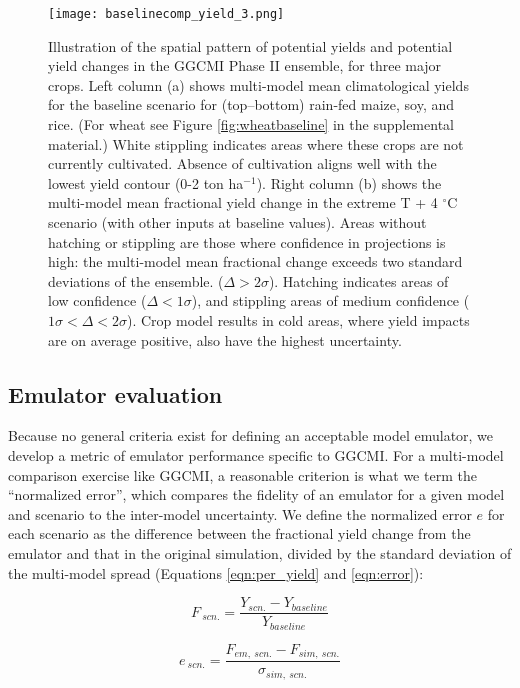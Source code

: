 \documentclass[preprint, 5p, times, twocolumn]{elsarticle}
\begin{document}
\begin{figure}[!htb]
\centering
   \texttt{[image: baselinecomp\_yield\_3.png]} 
   \caption{Illustration of the spatial pattern of potential yields and potential yield changes in the GGCMI Phase II ensemble, for three major crops. Left column (a) shows multi-model mean climatological yields for the baseline scenario for (top--bottom) rain-fed maize, soy, and rice. (For wheat see Figure \ref{fig:wheatbaseline} in the supplemental material.) White stippling indicates areas where these crops are not currently cultivated. Absence of cultivation aligns well with the lowest yield contour (0-2 ton ha$^{-1}$). Right column (b) shows the multi-model mean fractional yield change in the extreme T + 4 $^{\circ}$C scenario (with other inputs at baseline values). Areas without hatching or stippling are those where confidence in projections is high: the multi-model mean fractional change exceeds two standard deviations of the ensemble. ($\Delta > 2\sigma$). Hatching indicates areas of low confidence ($\Delta < 1 \sigma$), and stippling areas of medium confidence ($1 \sigma < \Delta < 2 \sigma$). Crop model results in cold areas, where yield impacts are on average positive, also have the highest uncertainty.}
   \label{fig:maizesoybaseline}
\end{figure}

\subsection{Emulator evaluation}
Because no general criteria exist for defining an acceptable model emulator, we develop a metric of emulator performance specific to GGCMI. For a multi-model comparison exercise like GGCMI, a reasonable criterion is what we term the ``normalized error'', which compares the fidelity of an emulator for a given model and scenario to the inter-model uncertainty. We define the normalized error $e$ for each scenario as the difference between the fractional yield change from the emulator and that in the original simulation, divided by the standard deviation of the multi-model spread (Equations \ref{eqn:per_yield} and  \ref{eqn:error}):

\begin{equation}
    \label{eqn:per_yield}
    F_{\: scn.}=\frac{Y_{scn.}-Y_{baseline}}{Y_{baseline}}
\end{equation}

\begin{equation}
    \label{eqn:error}
    e_{\: scn.} =\frac{F_{em, \: scn.}-F_{sim, \: scn.}}{\sigma_{sim, \: scn.}}
\end{equation}
\end{document}
